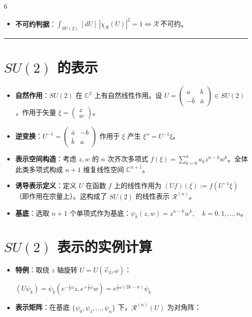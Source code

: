 \documentclass[landscape]{article}
\begin{document}
\begin{multicols*}{6}
\begin{itemize}
  $\int_{SU(2)}[dU]\,\chi_{\mathcal R}(U)\overline{\chi_{\mathcal R'}(U)}=\delta_{\mathcal R\mathcal R'}$。
  \item \textbf{不可约判据}：$\int_{SU(2)}[dU]\ |\chi_{\mathcal R}(U)|^2=1\iff \mathcal R\ \text{不可约}$。
\end{itemize}
\noindent\textcolor{blue}{\rule{\linewidth}{1pt}}
\section*{$SU(2)$ 的表示}
\begin{itemize}
  \item \textbf{自然作用}：$SU(2)$ 在 $\mathbb{C}^2$ 上有自然线性作用。设 $U=\begin{pmatrix} a & b \\ -\bar{b} & \bar{a} \end{pmatrix} \in SU(2)$，作用于矢量 $\xi = \begin{pmatrix} z \\ w \end{pmatrix}$。
  \item \textbf{逆变换}：$U^{-1} = \begin{pmatrix} \bar{a} & -b \\ \bar{b} & a \end{pmatrix}$ 作用于 $\xi$ 产生 $\xi'' = U^{-1}\xi$。
  \item \textbf{表示空间构造}：考虑 $z, w$ 的 $n$ 次齐次多项式 $f(\xi) = \sum_{k=0}^n a_k z^{n-k} w^k$。全体此类多项式构成 $n+1$ 维复线性空间 $\mathbb{C}^{n+1}$。
  \item \textbf{诱导表示定义}：定义 $U$ 在函数 $f$ 上的线性作用为 $(Uf)(\xi) := f(U^{-1}\xi)$（即作用在宗量上）。这构成了 $SU(2)$ 的线性表示 $\mathcal{R}^{(n)}$。
  \item \textbf{基底}：选取 $n+1$ 个单项式作为基底：$\psi_k(z,w) = z^{n-k} w^k, \quad k=0, 1, \dots, n$。
\end{itemize}

\section*{$SU(2)$ 表示的实例计算}
\begin{itemize}
  \item \textbf{特例}：取绕 $z$ 轴旋转 $U = U(\vec{e}_3, \omega)$：
  
  $(U\psi_k) = \psi_k(e^{-\frac{i}{2}\omega}z, e^{+\frac{i}{2}\omega}w) = e^{\frac{i}{2}\omega(2k-n)}\psi_k$
  \item \textbf{表示矩阵}：在基底 $\{\psi_0, \psi_1, \dots, \psi_n\}$ 下，$\mathcal{R}^{(n)}(U)$ 为对角阵：
  

\end{itemize}
\end{multicols*}
\end{document}
